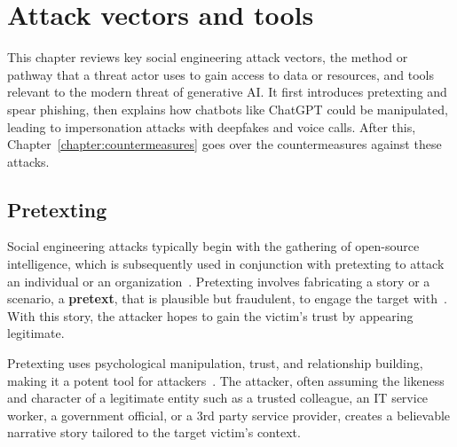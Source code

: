 \chapter{Attack vectors and tools\label{chapter:attacks}}
\begin{comment}
\end{comment}

This chapter reviews key social engineering attack vectors, the method or pathway that a threat actor uses to gain access to data or resources, and tools relevant to the modern threat of generative AI. It first introduces pretexting and spear phishing, then explains how chatbots like ChatGPT could be manipulated, leading to impersonation attacks with deepfakes and voice calls. After this, Chapter~\ref{chapter:countermeasures} goes over the countermeasures against these attacks.



\section{Pretexting}
\begin{comment}
\end{comment}

%
%
Social engineering attacks typically begin with the gathering of open-source intelligence, which is subsequently used in conjunction with pretexting to attack an individual or an organization~\citep{hadnagy_Social_Engineering_The_Science_2018}. Pretexting involves fabricating a story or a scenario, a \textbf{pretext}, that is plausible but fraudulent, to engage the target with~\citep{wang_Defining_Social_Engineering_2020}. With this story, the attacker hopes to gain the victim's trust by appearing legitimate. 

%
%
Pretexting uses psychological manipulation, trust, and relationship building, making it a potent tool for attackers~\citep{mitnick_The_Art_of_Deception_2003}. The attacker, often assuming the likeness and character of a legitimate entity such as a trusted colleague, an IT service worker, a government official, or a 3rd party service provider, creates a believable narrative story tailored to the target victim's context.

%
%







